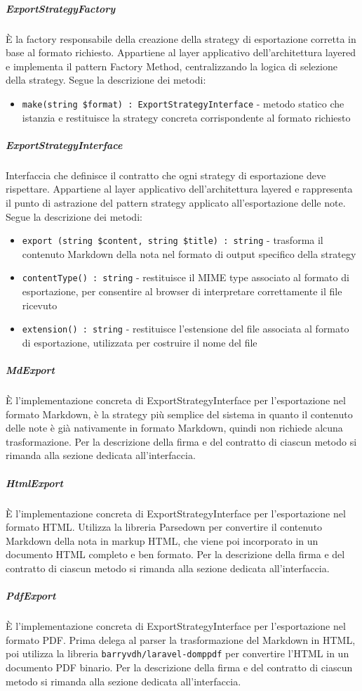 \documentclass[a4paper,10pt]{article}
\begin{document}
\subparagraph{ExportStrategyFactory} È la factory responsabile della creazione della strategy di esportazione corretta in base al formato richiesto. Appartiene al layer applicativo dell'architettura layered e implementa il pattern Factory Method, centralizzando la logica di selezione della strategy. Segue la descrizione dei metodi:
\begin{itemize}
    \item \texttt{make(string \$format) : ExportStrategyInterface} - metodo statico che istanzia e restituisce la strategy concreta corrispondente al formato richiesto
\end{itemize}
\subparagraph{ExportStrategyInterface} Interfaccia che definisce il contratto che ogni strategy di esportazione deve rispettare. Appartiene al layer applicativo dell'architettura layered e rappresenta il punto di astrazione del pattern strategy applicato all'esportazione delle note. Segue la descrizione dei metodi:
\begin{itemize}
    \item \texttt{export (string \$content, string \$title) : string} - trasforma il contenuto Markdown della nota nel formato di output specifico della strategy
    \item \texttt{contentType() : string} - restituisce il MIME type associato al formato di esportazione, per consentire al browser di interpretare correttamente il file ricevuto
    \item \texttt{extension() : string} - restituisce l'estensione del file associata al formato di esportazione, utilizzata per costruire il nome del file
\end{itemize}
\subparagraph{MdExport} È l'implementazione concreta di ExportStrategyInterface per l'esportazione nel formato Markdown, è la strategy più semplice del sistema in quanto il contenuto delle note è già nativamente in formato Markdown, quindi non richiede alcuna trasformazione. Per la descrizione della firma e del contratto di ciascun metodo si rimanda alla sezione dedicata all'interfaccia.
\subparagraph{HtmlExport} È l'implementazione concreta di ExportStrategyInterface per l'esportazione nel formato HTML. Utilizza la libreria Parsedown per convertire il contenuto Markdown della nota in markup HTML, che viene poi incorporato in un documento HTML completo e ben formato. Per la descrizione della firma e del contratto di ciascun metodo si rimanda alla sezione dedicata all'interfaccia.
\subparagraph{PdfExport} È l'implementazione concreta di ExportStrategyInterface per l'esportazione nel formato PDF. Prima delega al parser la trasformazione del Markdown in HTML, poi utilizza la libreria \texttt{barryvdh/laravel-domppdf} per convertire l'HTML in un documento PDF binario. Per la descrizione della firma e del contratto di ciascun metodo si rimanda alla sezione dedicata all'interfaccia.
\end{document}
